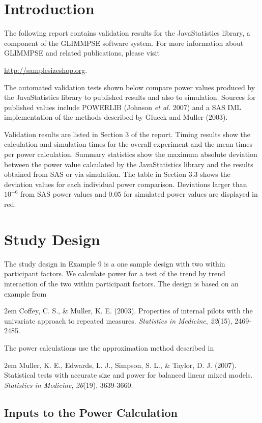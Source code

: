 \documentclass{glimmpse-report}
\begin{document}
\section{Introduction}
The following report contains validation results for the JavaStatistics library, a component of the GLIMMPSE software system.  For more information about GLIMMPSE and related publications, please visit

 

\href{http://samplesizeshop.org}{http://samplesizeshop.org}.

The automated validation tests shown below compare power values produced by the JavaStatistics library to published results and also to simulation.  Sources for published values include POWERLIB (Johnson \emph{et al.} 2007) and a SAS IML implementation of the methods described by Glueck and Muller (2003).

Validation results are listed in Section 3 of the report.  Timing results show the calculation and simulation times for the overall experiment and the mean times per power calculation.  Summary statistics show the maximum absolute deviation between the power value calculated by the JavaStatistics library and the results obtained from SAS or via simulation.  The table in Section 3.3 shows the deviation values for each individual power comparison.  Deviations larger than $10^{-6}$ from SAS power values and $0.05$ for simulated power values are displayed in red.

 \section{Study Design}
The study design in Example 9 is a one sample design with two within participant factors.  We calculate power for a test of the trend by trend interaction of the two within participant factors.  The design is based on an example from 

\hangindent2em
Coffey, C. S., \& Muller, K. E. (2003). Properties of internal pilots with the univariate approach to repeated measures. \emph{Statistics in Medicine}, \emph{22}(15), 2469-2485.

The power calculations use the approximation method described in 

\hangindent2em
Muller, K. E., Edwards, L. J., Simpson, S. L., \& Taylor, D. J. (2007). Statistical tests with accurate size and power for balanced linear mixed models. \emph{Statistics in Medicine}, \emph{26}(19), 3639-3660.
\subsection{Inputs to the Power Calculation}
\end{document}
